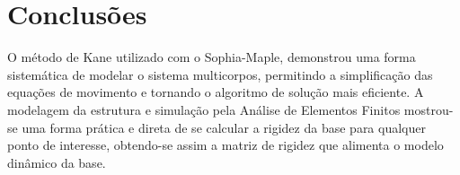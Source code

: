 \chapter{Conclusões}




O método de Kane utilizado com o Sophia-Maple, demonstrou uma forma sistemática
de modelar o sistema multicorpos, permitindo a simplificação das equações de
movimento e tornando o algoritmo de solução mais eficiente. A modelagem da
estrutura e simulação pela Análise de Elementos Finitos mostrou-se uma forma
prática e direta de se calcular a rigidez da base para qualquer ponto de
interesse, obtendo-se assim a matriz de rigidez que alimenta o modelo dinâmico
da base.


